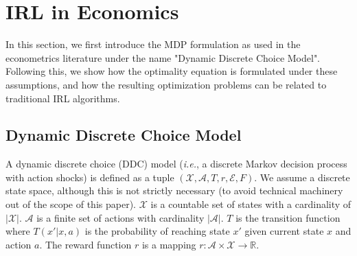 \documentclass{article}
\begin{document}
\section{IRL in Economics}

In this section, we first introduce the MDP formulation as used in the econometrics literature under the name "Dynamic Discrete Choice Model". Following this, we show how the optimality equation is formulated under these assumptions, and how the resulting optimization problems can be related to traditional IRL algorithms.

\subsection{Dynamic Discrete Choice Model}

A dynamic discrete choice (DDC) model (\emph{i.e.}, a discrete Markov decision process with action shocks) is defined as a tuple $(\mathcal{X,A}, T,r,\mathcal{E},F)$. 
We assume a discrete state space, although this is not strictly necessary (to avoid technical machinery out of the scope of this paper).
$\mathcal{X}$ is a countable set of states with a cardinality of $|\mathcal{X}|$. $\mathcal{A}$ is a finite set of actions with cardinality $|\mathcal{A}|$. $T$ is the transition function where $T(x'|x,a)$ is the probability of reaching state $x'$ given current state $x$ and action $a$. The reward function $r$ is a mapping $r:\mathcal{A}\times\mathcal{X}\rightarrow \mathbb{R}$.
\end{document}

